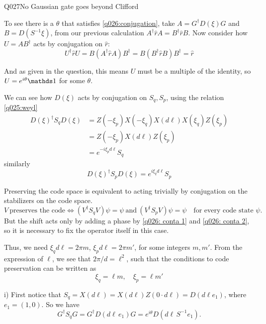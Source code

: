 \begin{entry}{Q027}{No Gaussian gate goes beyond Clifford}
\begin{solution}[Part (a)]
To see there is a $\theta$ that satisfies \eqref{q026:conjugation}, take $A=G^\dagger D(\xi)G$ and $B=D(S^{-1}\xi)$, from our previous calculation $A^\dagger\hat r A = B^\dagger \hat r B$. Now consider how $U=AB^\dagger$ acts by conjugation on $\hat r$: 
$$ U^\dagger\hat r U = B(A^\dagger \hat r A) B^\dagger = B(B^\dagger \hat r B) B^\dagger = \hat r
$$

And as given in the question, this means $U$ must be a multiple of the identity, so $U=e^{i\theta} \id$ for some $\theta$.

\end{solution}

\begin{solution}[Part (b)]
We can see how $D(\xi)$ acts by conjugation on $S_q,S_p$, using the relation \eqref{q025:weyl}
\begin{equation}
\begin{split}
    D(\xi)^\dagger S_q D(\xi) &= Z(-\xi_p)X(-\xi_q) X(d\ell)X(\xi_q) Z(\xi_p)\\
    &=   Z(-\xi_p) X(d\ell) Z(\xi_p)\\
    &=  e^{-i\xi_p d\ell} S_q
    \label{q026: conta 1}
\end{split}
\end{equation}
similarly
\begin{equation}
    D(\xi)^\dagger S_p D(\xi) =  e^{i\xi_q d\ell} S_p
    \label{q026: conta 2}
\end{equation}

Preserving the code space is equivalent to acting trivially by conjugation on the stabilizers on the code space. 
$$V\ \text{preserves the code}\iff (V^\dagger S_qV)\psi=\psi\ \text{and}\ (V^\dagger S_pV)\psi=\psi\quad\text{for every code state }\psi.$$
But the shift acts only by adding a phase by \eqref{q026: conta 1} and \eqref{q026: conta 2}, so it is necessary to fix the operator itself in this case.

Thus, we need $\xi_q d\ell = 2\pi m$, $\xi_p d\ell=2\pi m'$, for some integers $m,m'$. From the expression of $\ell$, we see that $2\pi/d=\ell^2$, such that the conditions to code preservation can be written as 
\begin{equation}
    \xi_q = \ell m,\quad \xi_p = \ell m'
\end{equation} 

\end{solution}

\begin{solution}[Part (c)]
i) First notice that $S_q = X(d\ell)= X(d\ell)Z(0\cdot d\ell)=D(d\ell e_1)$, where $e_1=(1,0)$. So we have 
\begin{equation}
    G^\dagger S_q G = G^\dagger D(d\ell\, e_1) G = e^{i\theta} D(d\ell\, S^{-1}e_1).
\end{equation}


\end{solution}
\end{entry}

